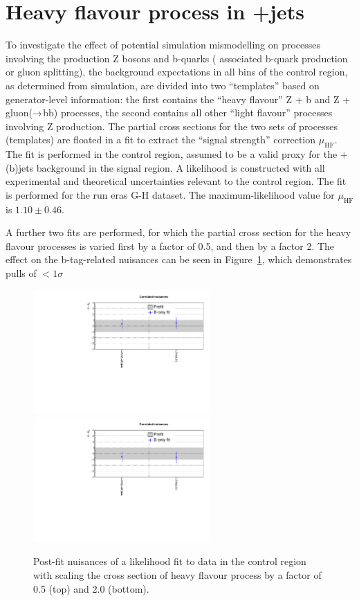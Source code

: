 
\section{Heavy flavour process in \znunu+jets}
\label{sec:zplusbb_app}

To investigate the effect of potential simulation mismodelling on
processes involving the production Z bosons and b-quarks (\ie
associated b-quark production or gluon splitting), the background
expectations in all bins of the \mmj control region, as determined
from simulation, are divided into two ``templates'' based on
generator-level information: the first contains the ``heavy flavour''
Z + b and Z + gluon($\rightarrow$bb) processes, the second contains
all other ``light flavour'' processes involving Z production. The
partial cross sections for the two sets of processes (templates) are
floated in a fit to extract the ``signal strength'' correction
$\mu_\mathrm{HF}$. The fit is performed in the \mmj control region,
assumed to be a valid proxy for the \znunu + (b)jets background in the
signal region. A likelihood is constructed with all experimental and 
theoretical uncertainties relevant to the \mmj control region. The fit
is performed for the run eras G-H dataset. The maximum-likelihood
value for $\mu_\mathrm{HF}$ is $1.10 \pm 0.46$.

A further two fits are performed, for which the partial cross section
for the heavy flavour processes is varied first by a factor of 0.5,
and then by a factor 2. The effect on the b-tag-related nuisances can
be seen in Figure~\ref{fig:zplusbb}, which demonstrates pulls of
$<1\sigma$

\begin{figure}[h!]
  \centering
  \includegraphics[width=0.6\textwidth]{figures/ZPlusbb/TemplateFitv1_HFXs0p5}
  \includegraphics[width=0.6\textwidth]{figures/ZPlusbb/TemplateFitv1_HFXs2p0}
  \caption{\label{fig:btagsfge1b} Post-fit nuisances of a likelihood
    fit to data in the \mmj control region with scaling the cross section of heavy 
    flavour process by a factor of 0.5 (top) and 2.0 (bottom). }
  \label{fig:zplusbb}
\end{figure}

